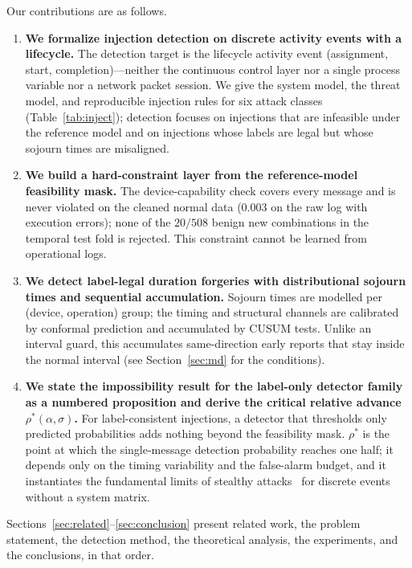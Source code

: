 \documentclass[manuscript,screen,review]{acmart}
\begin{document}
Our contributions are as follows.
\begin{enumerate}
\item \textbf{We formalize injection detection on discrete activity events with a lifecycle.}
The detection target is the lifecycle activity event (assignment, start, completion)---neither the continuous control layer nor a single process variable nor a network packet session. We give the system model, the threat model, and reproducible injection rules for six attack classes (Table~\ref{tab:inject}); detection focuses on injections that are infeasible under the reference model and on injections whose labels are legal but whose sojourn times are misaligned.
\item \textbf{We build a hard-constraint layer from the reference-model feasibility mask.}
The device-capability check covers every message and is never violated on the cleaned normal data ($0.003$ on the raw log with execution errors); none of the $20/508$ benign new combinations in the temporal test fold is rejected. This constraint cannot be learned from operational logs.
\item \textbf{We detect label-legal duration forgeries with distributional sojourn times and sequential accumulation.}
Sojourn times are modelled per (device, operation) group; the timing and structural channels are calibrated by conformal prediction and accumulated by {CUSUM} tests. Unlike an interval guard, this accumulates same-direction early reports that stay inside the normal interval (see Section~\ref{sec:md} for the conditions).
\item \textbf{We state the impossibility result for the label-only detector family as a numbered proposition and derive the critical relative advance $\rho^*(\alpha,\sigma)$.}
For label-consistent injections, a detector that thresholds only predicted probabilities adds nothing beyond the feasibility mask. $\rho^*$ is the point at which the single-message detection probability reaches one half; it depends only on the timing variability and the false-alarm budget, and it instantiates the fundamental limits of stealthy attacks~\cite{liu2022limits} for discrete events without a system matrix.
\end{enumerate}

Sections~\ref{sec:related}--\ref{sec:conclusion} present related work, the problem statement, the detection method, the theoretical analysis, the experiments, and the conclusions, in that order.

\end{document}
